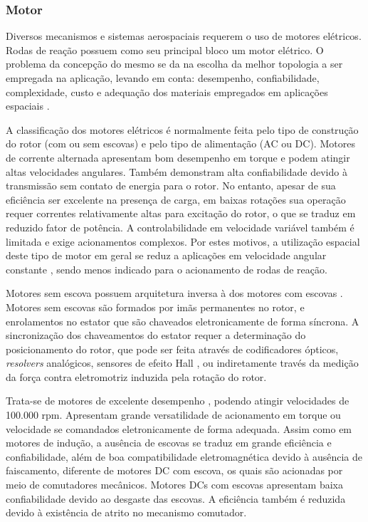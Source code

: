 \subsubsection{Motor} \label{sec:motor}

Diversos mecanismos e sistemas aerospaciais requerem o uso de motores elétricos. Rodas de reação possuem como seu principal bloco um motor elétrico. O problema da concepção do mesmo se da na escolha da melhor topologia a ser empregada na aplicação, levando em conta: desempenho, confiabilidade, complexidade, custo e adequação dos materiais empregados em aplicações espaciais \cite{favre1999european}. 
	
A classificação dos motores elétricos é normalmente feita pelo tipo de construção do rotor (com ou sem escovas) e pelo tipo de alimentação (AC ou DC). Motores de corrente alternada apresentam bom desempenho em torque e podem atingir altas velocidades angulares. Também demonstram alta confiabilidade devido à  transmissão sem contato de energia para o rotor. No entanto, apesar de sua eficiência ser excelente na presença de carga, em baixas rotações sua operação requer correntes relativamente altas para excitação do rotor, o que se traduz em reduzido fator de potência. A controlabilidade em velocidade variável também é limitada e exige acionamentos complexos. Por estes motivos, a utilização espacial deste tipo de motor em geral se reduz a aplicações em velocidade angular constante \cite{favre1999european}, sendo menos indicado para o acionamento de rodas de reação.
	
Motores sem escova possuem arquitetura inversa à  dos motores com escovas \cite{laxminarayana2011design}. Motores sem escovas são formados por imãs permanentes no rotor, e enrolamentos no estator que são chaveados eletronicamente de forma síncrona. A sincronização dos chaveamentos do estator requer a determinação do posicionamento do rotor, que pode ser feita através de codificadores ópticos, \textit{resolvers} analógicos, sensores de efeito Hall \cite{kim2003error}, ou indiretamente través da medição da força contra eletromotriz induzida pela rotação do rotor.
	
Trata-se de motores de excelente desempenho \cite{saxena2012ultra}, podendo atingir velocidades de 100.000 rpm. Apresentam grande versatilidade de acionamento em torque ou velocidade se comandados eletronicamente de forma adequada. Assim como em motores de indução, a ausência de escovas se traduz em grande eficiência e confiabilidade, além de boa compatibilidade eletromagnética devido à  ausência de faiscamento, diferente de motores DC com escova, os quais são acionadas por meio de comutadores mecânicos. Motores DCs com escovas apresentam baixa confiabilidade devido ao desgaste das escovas. A eficiência também é reduzida devido à existência de atrito no mecanismo comutador. 

